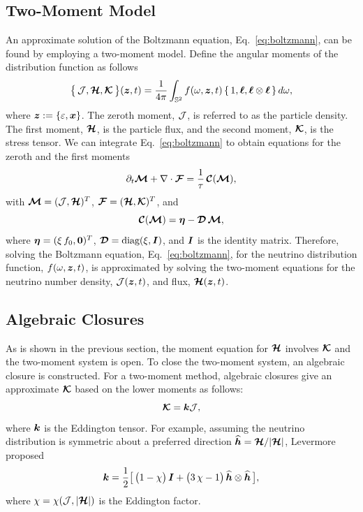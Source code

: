\subsection{Two-Moment Model}
An approximate solution of the Boltzmann equation, Eq.~\eqref{eq:boltzmann}, can be found by employing a two-moment model.
Define the angular moments of the distribution function as follows
\begin{equation}
  \big\{\,\mathcal{J},\boldsymbol{\mathcal{H}},\boldsymbol{\mathcal{K}}\,\big\}(\boldsymbol{z},t)
  =\frac{1}{4\pi}\int_{\mathbb{S}^{2}}f(\omega,\boldsymbol{z},t)\,\{\,1,\boldsymbol{\ell},\boldsymbol{\ell}\otimes\boldsymbol{\ell}\,\}\,d\omega,
  \label{eq:angularMoments}
\end{equation}
where $\boldsymbol{z}:=\{\varepsilon,\boldsymbol{x}\}$.
The zeroth moment, $\mathcal{J}$, is referred to as the particle density.
The first moment, $\boldsymbol{\mathcal{H}}$, is the particle flux, and the second moment, $\boldsymbol{\mathcal{K}}$, is the stress tensor.
We can integrate Eq.~\eqref{eq:boltzmann} to obtain equations for the zeroth and the first moments
\begin{equation}
  \partial_{t}{\boldsymbol{\mathcal{M}}}+\nabla\cdot\boldsymbol{\mathcal{F}}=\frac{1}{\tau}\,\boldsymbol{\mathcal{C}}(\boldsymbol{\mathcal{M}}),
  \label{eq:momentEquations}
\end{equation}
with $\boldsymbol{\mathcal{M}}=(\mathcal{J},\boldsymbol{\mathcal{H}})^{T}$, $\boldsymbol{\mathcal{F}}=(\boldsymbol{\mathcal{H}},\boldsymbol{\mathcal{K}})^{T}$, and
\begin{equation}
  \boldsymbol{\mathcal{C}}(\boldsymbol{\mathcal{M}})=\boldsymbol{\eta}-\boldsymbol{\mathcal{D}}\,\boldsymbol{\mathcal{M}},
  \label{eq:collisionTermMoments}
\end{equation}
where $\boldsymbol{\eta}=(\xi\,f_{0},\boldsymbol{0})^{T}$, $\boldsymbol{\mathcal{D}}=\mbox{diag}(\xi,\boldsymbol{I})$, and
$\boldsymbol{I}$ is the identity matrix.
Therefore, solving the Boltzmann equation, Eq.~\eqref{eq:boltzmann}, for the neutrino distribution function, $f(\omega,\boldsymbol{z},t)$, is approximated by solving the two-moment equations for the neutrino number density, $\mathcal{J}(\boldsymbol{z},t)$, and flux, $\boldsymbol{\mathcal{H}}(\boldsymbol{z},t)$.

\subsection{Algebraic Closures }
As is shown in the previous section, the moment equation for $\boldsymbol{\mathcal{H}}$ involves $\boldsymbol{\mathcal{K}}$ and the two-moment system is open. 
To close the two-moment system, an algebraic closure is constructed.
For a two-moment method, algebraic closures give an approximate $\boldsymbol{\mathcal{K}}$ based on the lower moments as follows:
\begin{equation}
\boldsymbol{\mathcal{K}} = \boldsymbol{k} \mathcal{J},
\end{equation}
where $\boldsymbol{k}$ is the Eddington tensor.
For example, assuming the neutrino distribution is symmetric about a preferred direction $\widehat{\boldsymbol{h}}=\boldsymbol{\mathcal{H}}/|\boldsymbol{\mathcal{H}}|$, Levermore\cite{levermore_1984} proposed
\begin{equation}
  \boldsymbol{k}=\frac{1}{2}\big[\,\big(1-\chi\big)\,\boldsymbol{I}+\big(3\,\chi-1\big)\,\widehat{\boldsymbol{h}}\otimes\widehat{\boldsymbol{h}}\,\big],
  \label{eq:eddingtonTensor}
\end{equation}
where $\chi=\chi(\mathcal{J},|\boldsymbol{\mathcal{H}}|)$ is the Eddington factor. 

